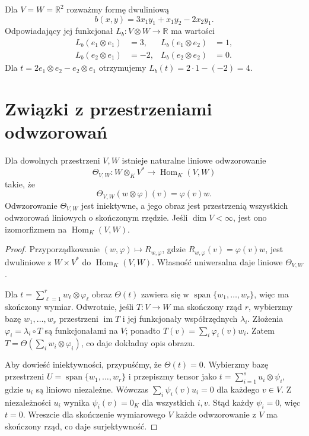 \begin{przyklad}
\label{prz:lin10-forma}
Dla \(V=W=\mathbb R^2\)
rozważmy formę dwuliniową
\[
 b(x,y)=3x_1y_1+x_1y_2-2x_2y_1.
\]
Odpowiadający jej funkcjonał
\(L_b\colon V\otimes W\to\mathbb R\)
ma wartości
\[
 \begin{aligned}
 L_b(e_1\otimes e_1)&=3,&
 L_b(e_1\otimes e_2)&=1,\\
 L_b(e_2\otimes e_1)&=-2,&
 L_b(e_2\otimes e_2)&=0.
 \end{aligned}
\]
Dla
\(t=2e_1\otimes e_2-e_2\otimes e_1\)
otrzymujemy
\(L_b(t)=2\cdot1-(-2)=4\).
\end{przyklad}

\section{Związki z przestrzeniami odwzorowań}
\label{sec:lin10-hom}

\begin{twierdzenie}
\label{thm:lin10-hom-rzad}
Dla dowolnych przestrzeni \(V,W\)
istnieje naturalne liniowe
odwzorowanie
\[
 \Theta_{V,W}\colon
 W\otimes_KV^*\to\operatorname{Hom}_K(V,W)
\]
takie, że
\[
 \Theta_{V,W}(w\otimes\varphi)(v)
 =\varphi(v)w.
\]
Odwzorowanie \(\Theta_{V,W}\)
jest iniektywne, a jego obraz
jest przestrzenią wszystkich
odwzorowań liniowych o skończonym
rzędzie. Jeśli \(\dim V<\infty\),
jest ono izomorfizmem na
\(\operatorname{Hom}_K(V,W)\).
\end{twierdzenie}
\begin{proof}
Przyporządkowanie
\((w,\varphi)\mapsto R_{w,\varphi}\),
gdzie
\(R_{w,\varphi}(v)=\varphi(v)w\),
jest dwuliniowe z \(W\times V^*\)
do \(\operatorname{Hom}_K(V,W)\).
Własność uniwersalna
daje liniowe \(\Theta_{V,W}\).

Dla
\(t=\sum_{\ell=1}^r
w_\ell\otimes\varphi_\ell\)
obraz \(\Theta(t)\)
zawiera się w
\(\operatorname{span}\{w_1,\ldots,w_r\}\),
więc ma skończony wymiar.
Odwrotnie, jeśli \(T\colon V\to W\)
ma skończony rząd \(r\),
wybierzmy bazę
\(w_1,\ldots,w_r\)
przestrzeni \(\operatorname{im}T\)
i jej funkcjonały współrzędnych
\(\lambda_i\).
Złożenia \(\varphi_i=\lambda_i\circ T\)
są funkcjonałami na \(V\);
ponadto \(T(v)=\sum_i\varphi_i(v)w_i\).
Zatem
\(T=\Theta(\sum_iw_i\otimes\varphi_i)\),
co daje dokładny opis obrazu.

Aby dowieść iniektywności,
przypuśćmy, że \(\Theta(t)=0\).
Wybierzmy bazę przestrzeni
\(U=\operatorname{span}\{w_1,\ldots,w_r\}\)
i przepiszmy tensor jako
\(t=\sum_{i=1}^s u_i\otimes\psi_i\),
gdzie \(u_i\) są liniowo niezależne.
Wówczas
\(\sum_i\psi_i(v)u_i=0\)
dla każdego \(v\in V\).
Z niezależności \(u_i\)
wynika \(\psi_i(v)=0_K\)
dla wszystkich \(i,v\).
Stąd każdy \(\psi_i=0\),
więc \(t=0\).
Wreszcie dla skończenie
wymiarowego \(V\) każde
odwzorowanie z \(V\)
ma skończony rząd,
co daje surjektywność.
\end{proof}

